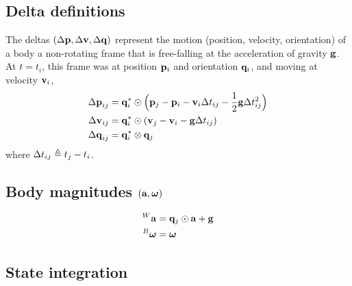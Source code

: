 


\subsection{Delta definitions}

The deltas $({\Delta{\bf p}},{\Delta{\bf v}},{\Delta{\bf q}})$ represent the motion (position, velocity, orientation) of a body \wrt a non-rotating frame that is free-falling at the acceleration of gravity ${\bf g}$. At $t=t_i$, this frame was at position ${\bf p}_i$ and orientation ${\bf q}_i$, and moving at velocity ${\bf v}_i$,
%
\begin{align}
\begin{split}
{\Delta{\bf p}}_{ij} &= {\bf q}_i^*\odot\Big({\bf p}_j - {\bf p}_i - {\bf v}_i\Delta t_{ij} - \frac12{\bf g}\Delta t_{ij}^2\Big) \\
{\Delta{\bf v}}_{ij} &= {\bf q}_i^*\odot({\bf v}_j - {\bf v}_i - {\bf g}\Delta t_{ij}) \\
{\Delta{\bf q}}_{ij} &= {\bf q}_i^*\otimes{\bf q}_j 
\end{split}
\end{align}
%
where $\Delta t_{ij} \triangleq t_j - t_i$.

\subsection{Body magnitudes $({\bf a},{{\bm \omega}})$}%

\begin{align}
\begin{split}
{}^W{\bf a} &= {\bf q}_j\odot{\bf a} + {\bf g} \\
{}^B{{\bm \omega}} &= {{\bm \omega}}
\end{split}
\end{align}



\subsection{State integration}

